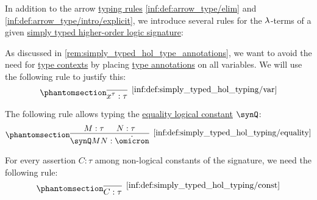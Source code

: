 \begin{definition}\label{def:simply_typed_hol_typing}\mimprovised
  In addition to the arrow \hyperref[con:typing_rule]{typing rules} \ref{inf:def:arrow_type/elim} and \ref{inf:def:arrow_type/intro/explicit}, we introduce several rules for the \( {\mathrm \lambda} \)-terms of a given \hyperref[def:simply_typed_hol_signature]{simply typed higher-order logic signature}:
  \begin{thmenum}
     As discussed in \cref{rem:simply_typed_hol_type_annotations}, we want to avoid the need for \hyperref[def:type_context]{type contexts} by placing \hyperref[con:type_annotation]{type annotations} on all variables. We will use the following rule to justify this:
    \begin{equation*}\taglabel[\ensuremath{ \logic{Var} }]{inf:def:simply_typed_hol_typing/var}
      \begin{prooftree}
        \infer0[\ref{inf:def:simply_typed_hol_typing/var}]{ x^\tau: \tau }
      \end{prooftree}
    \end{equation*}

     The following rule allows typing the \hyperref[def:simply_typed_hol_signature/const]{equality logical constant} \( \synQ \):
    \begin{equation*}\taglabel[\ensuremath{ Q_+ }]{inf:def:simply_typed_hol_typing/equality}
      \begin{prooftree}
        \hypo{ M: \tau }
        \hypo{ N: \tau }
        \infer2[\ref{inf:def:simply_typed_hol_typing/equality}]{ \synQ M N: \syn\omicron }
      \end{prooftree}
    \end{equation*}

     For every assertion \( C: \tau \) among non-logical constants of the signature, we need the following rule:
    \begin{equation*}\taglabel[\ensuremath{ \logic{Ax}_C }]{inf:def:simply_typed_hol_typing/const}
      \begin{prooftree}
        \infer0[\ref{inf:def:simply_typed_hol_typing/const}]{ C: \tau }
      \end{prooftree}
    \end{equation*}
  \end{thmenum}
\end{definition}
